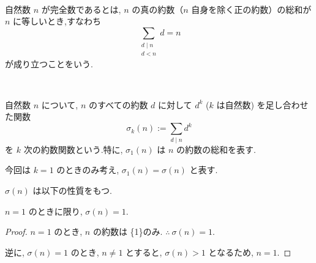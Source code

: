 %

\begin{definition}[完全数]\label{perfect}\leanok~\

自然数 \(n\) が完全数であるとは, \(n\) の真の約数（\(n\) 自身を除く正の約数）の総和が \(n\) に等しいとき,すなわち
\[
\sum_{\substack{d \mid n\\ d < n}} d = n
\]
\;\;\;が成り立つことをいう.

\end{definition}


\begin{definition}[約数関数]\label{sigma_div}\leanok~\

自然数 \(n\) について, \(n\) のすべての約数 \(d\) に対して \(d^k\) (\(k\) は自然数) を足し合わせた関数
\[
\sigma_k(n) := \sum_{d \mid n} d^k
\]
\;\;\;を \(k\) 次の約数関数という.特に, \(\sigma_1(n)\) は \(n\) の約数の総和を表す.

\end{definition}

\vspace{0.5\baselineskip}

今回は \(k = 1\) のときのみ考え, \(\sigma_1(n) = \sigma(n)\) と表す.

\vspace{0.5\baselineskip}

\(\sigma(n)\) は以下の性質をもつ.

\begin{lemma}\label{one_iff_sum_divisors_eq_one}\leanok

\(n = 1\) のときに限り, \(\sigma(n) = 1\).

\end{lemma}

\begin{proof}
\(n = 1\) のとき, \(n\) の約数は \{1\}のみ. \(\therefore ~\sigma(n) = 1\).

逆に, \(\sigma(n) = 1\) のとき, \(n \neq 1\) とすると, \(\sigma(n) > 1\) となるため, \(n = 1\).

\end{proof}

